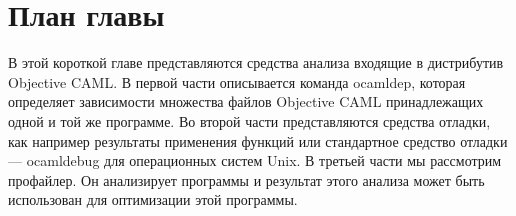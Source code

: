 \section {План главы}

В этой короткой главе представляются средства анализа входящие в дистрибутив
Objective CAML. В первой части описывается команда ocamldep, которая определяет
зависимости множества файлов Objective CAML принадлежащих одной и той же
программе. Во второй части представляются средства отладки, как например
результаты применения функций или стандартное средство отладки — ocamldebug для
операционных систем Unix. В третьей части мы рассмотрим профайлер. Он
анализирует программы и результат этого анализа может быть использован для
оптимизации этой программы.
